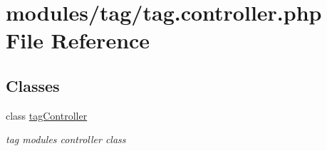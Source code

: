 \hypertarget{tag_8controller_8php}{}\section{modules/tag/tag.controller.\+php File Reference}
\label{tag_8controller_8php}
\subsection*{Classes}
\begin{DoxyCompactItemize}
\item 
class \hyperlink{classtagController}{tag\+Controller}
\begin{DoxyCompactList}\small\item\em tag module\textquotesingle{}s controller class \end{DoxyCompactList}\end{DoxyCompactItemize}

